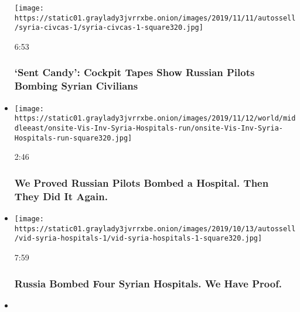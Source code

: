 \begin{itemize}
  \texttt{[image: https://static01.graylady3jvrrxbe.onion/images/2019/11/11/autossell/syria-civcas-1/syria-civcas-1-square320.jpg]}

  6:53

  \hypertarget{sent-candy-cockpit-tapes-show-russian-pilots-bombing-syrian-civilians}{%
  \subsubsection{`Sent Candy': Cockpit Tapes Show Russian Pilots Bombing
  Syrian
  Civilians}\label{sent-candy-cockpit-tapes-show-russian-pilots-bombing-syrian-civilians}}
\item
  \href{https://www.nytimes3xbfgragh.onion/video/world/middleeast/100000006815692/syria-hospitals-russia.html?action=click\&module=video-series-bar\&region=header\&pgtype=Article\&playlistId=video/investigations}{}

  \texttt{[image: https://static01.graylady3jvrrxbe.onion/images/2019/11/12/world/middleeast/onsite-Vis-Inv-Syria-Hospitals-run/onsite-Vis-Inv-Syria-Hospitals-run-square320.jpg]}

  2:46

  \hypertarget{we-proved-russian-pilots-bombed-a-hospital-then-they-did-it-again}{%
  \subsubsection{We Proved Russian Pilots Bombed a Hospital. Then They
  Did It
  Again.}\label{we-proved-russian-pilots-bombed-a-hospital-then-they-did-it-again}}
\item
  \href{https://www.nytimes3xbfgragh.onion/video/world/middleeast/100000005697485/russia-bombed-syrian-hospitals.html?action=click\&module=video-series-bar\&region=header\&pgtype=Article\&playlistId=video/investigations}{}

  \texttt{[image: https://static01.graylady3jvrrxbe.onion/images/2019/10/13/autossell/vid-syria-hospitals-1/vid-syria-hospitals-1-square320.jpg]}

  7:59

  \hypertarget{russia-bombed-four-syrian-hospitals-we-have-proof}{%
  \subsubsection{Russia Bombed Four Syrian Hospitals. We Have
  Proof.}\label{russia-bombed-four-syrian-hospitals-we-have-proof}}
\item
  \href{https://www.nytimes3xbfgragh.onion/video/world/asia/100000006745719/hong-kong-protester-shot.html?action=click\&module=video-series-bar\&region=header\&pgtype=Article\&playlistId=video/investigations}{}


\end{itemize}
